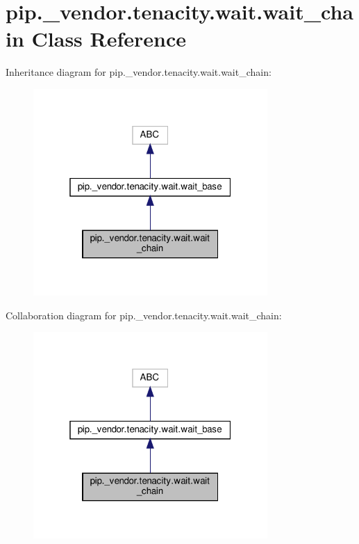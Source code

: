 \hypertarget{classpip_1_1__vendor_1_1tenacity_1_1wait_1_1wait__chain}{}\section{pip.\+\_\+vendor.\+tenacity.\+wait.\+wait\+\_\+chain Class Reference}
\label{classpip_1_1__vendor_1_1tenacity_1_1wait_1_1wait__chain}


Inheritance diagram for pip.\+\_\+vendor.\+tenacity.\+wait.\+wait\+\_\+chain\+:
\nopagebreak
\begin{figure}[H]
\begin{center}
\leavevmode
\includegraphics[width=253pt]{classpip_1_1__vendor_1_1tenacity_1_1wait_1_1wait__chain__inherit__graph}
\end{center}
\end{figure}


Collaboration diagram for pip.\+\_\+vendor.\+tenacity.\+wait.\+wait\+\_\+chain\+:
\nopagebreak
\begin{figure}[H]
\begin{center}
\leavevmode
\includegraphics[width=253pt]{classpip_1_1__vendor_1_1tenacity_1_1wait_1_1wait__chain__coll__graph}
\end{center}
\end{figure}
